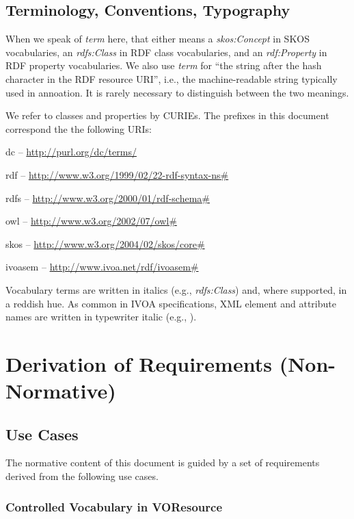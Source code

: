 \documentclass[11pt,a4paper]{ivoa}
\newcommand{\vocterm}[1]{\emph{\color{termcolor}#1}}
\begin{document}
\subsection{Terminology, Conventions, Typography}

When we speak of \emph{term} here, that either means a \vocterm{skos:Concept}
in SKOS vocabularies, an \vocterm{rdfs:Class} in RDF class vocabularies,
and an \vocterm{rdf:Property} in RDF property vocabularies.  We also use
\emph{term} for ``the string after the hash character in
the RDF resource URI'', i.e., the machine-readable string typically used
in annoation.  It is rarely necessary to distinguish between the two
meanings.

We refer to classes and properties by CURIEs.  The prefixes in this
document correspond the the following URIs:

\begin{compactitem}
\item dc -- \url{http://purl.org/dc/terms/}
\item rdf -- \url{http://www.w3.org/1999/02/22-rdf-syntax-ns#}
\item rdfs -- \url{http://www.w3.org/2000/01/rdf-schema#}
\item owl -- \url{http://www.w3.org/2002/07/owl#}
\item skos -- \url{http://www.w3.org/2004/02/skos/core#}
\item ivoasem -- \url{http://www.ivoa.net/rdf/ivoasem#}
\end{compactitem}

Vocabulary terms are written in italics (e.g., \vocterm{rdfs:Class})
and, where supported, in a reddish hue.  As common in IVOA
specifications, XML element and attribute names are written in
typewriter italic (e.g., ).

\section{Derivation of Requirements (Non-Normative)}

\subsection{Use Cases}
\label{sect:usecases}

The normative content of this document is guided by a set of
requirements derived from the following use cases.

\subsubsection{Controlled Vocabulary in VOResource}
\label{uc:simplevoc}
\end{document}
